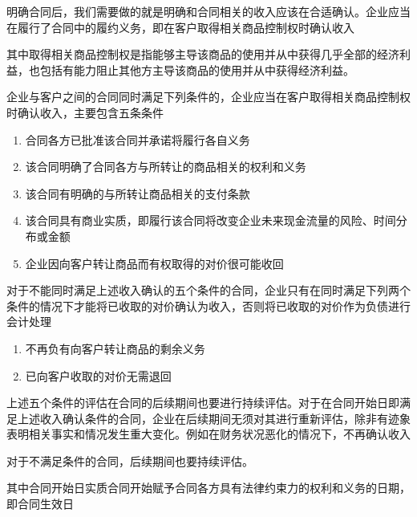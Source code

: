 \documentclass[UTF8,12pt]{ctexart}
\numberwithin{equation}{section} %
\numberwithin{figure}{section}
\numberwithin{table}{section}
\begin{document}
	明确合同后，我们需要做的就是明确和合同相关的收入应该在合适确认。企业应当在履行了合同中的履约义务，即在客户取得相关商品控制权时确认收入
	
	其中取得相关商品控制权是指能够主导该商品的使用并从中获得几乎全部的经济利益，也包括有能力阻止其他方主导该商品的使用并从中获得经济利益。
	
	企业与客户之间的合同同时满足下列条件的，企业应当在客户取得相关商品控制权时确认收入，主要包含五条条件
	\begin{enumerate}
		\item 合同各方已批准该合同并承诺将履行各自义务
		
		\item 该合同明确了合同各方与所转让的商品相关的权利和义务
		
		\item 该合同有明确的与所转让商品相关的支付条款
		
		\item 该合同具有商业实质，即履行该合同将改变企业未来现金流量的风险、时间分布或金额
		
		\item 企业因向客户转让商品而有权取得的对价很可能收回
	\end{enumerate}
	对于不能同时满足上述收入确认的五个条件的合同，企业只有在同时满足下列两个条件的情况下才能将已收取的对价确认为收入，否则将已收取的对价作为负债进行会计处理
	\begin{enumerate}
		\item 不再负有向客户转让商品的剩余义务
		
		\item 已向客户收取的对价无需退回
	\end{enumerate}

	上述五个条件的评估在合同的后续期间也要进行持续评估。对于在合同开始日即满足上述收入确认条件的合同，企业在后续期间无须对其进行重新评估，除非有迹象表明相关事实和情况发生重大变化。例如在财务状况恶化的情况下，不再确认收入
	
	对于不满足条件的合同，后续期间也要持续评估。
	
	其中合同开始日实质合同开始赋予合同各方具有法律约束力的权利和义务的日期，即合同生效日
	
\end{document}
